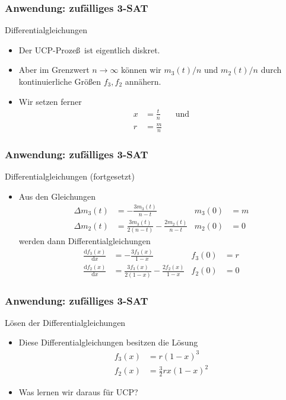 \documentclass{beamer}
\newcommand\dd{\mathrm d}
\newcommand{\mytitle}{Anwendung: zuf\"alliges 3-SAT}
\begin{document}
\begin{frame}\frametitle{\mytitle}
	\begin{block}{Differentialgleichungen}
		\begin{itemize}
			\item Der UCP-Proze\ss\ ist eigentlich diskret.
			\item Aber im Grenzwert $n\to\infty$ k\"onnen wir $m_3(t)/n$ und $m_2(t)/n$ durch kontinuierliche Gr\"o\ss en $f_3,f_2$ ann\"ahern.
			\item Wir setzen ferner 
				\begin{align*}
					x&=\frac{t}{n}&&\mbox{und}\\
					r&=\frac{m}{n}
				\end{align*}
		\end{itemize}
	\end{block}
\end{frame}

\begin{frame}\frametitle{\mytitle}
	\begin{block}{Differentialgleichungen (fortgesetzt)}
		\begin{itemize}
		\item Aus den Gleichungen
				\begin{align*}
					\Delta m_3(t)&=-\frac{3m_3(t)}{n-t}&m_3(0)&=m\\
					\Delta m_2(t)&=\frac{3m_3(t)}{2(n-t)}-\frac{2m_2(t)}{n-t}&m_2(0)&=0
				\end{align*}
				werden dann Differentialgleichungen
				\begin{align*}
					\frac{\dd f_3(x)}{\dd x}&=-\frac{3f_3(x)}{1-x}&f_3(0)&=r\\
					\frac{\dd f_2(x)}{\dd x}&=\frac{3f_3(x)}{2(1-x)}-\frac{2f_2(x)}{1-x}&f_2(0)&=0
				\end{align*}
		\end{itemize}
	\end{block}
\end{frame}

\begin{frame}\frametitle{\mytitle}
	\begin{block}{L\"osen der Differentialgleichungen}
		\begin{itemize}
		\item Diese Differentialgleichungen besitzen die L\"osung
			\begin{align*}
				f_3(x)&=r(1-x)^3\\
				f_2(x)&=\frac{3}{2}rx(1-x)^2
			\end{align*}
		\item Was lernen wir daraus f\"ur UCP?
		\end{itemize}
	\end{block}
\end{frame}
\end{document}
